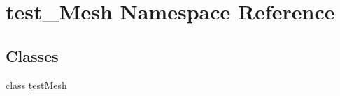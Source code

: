\hypertarget{namespacetest__Mesh}{}\section{test\+\_\+\+Mesh Namespace Reference}
\label{namespacetest__Mesh}
\subsection*{Classes}
\begin{DoxyCompactItemize}
\item 
class \hyperlink{classtest__Mesh_1_1testMesh}{test\+Mesh}
\end{DoxyCompactItemize}

